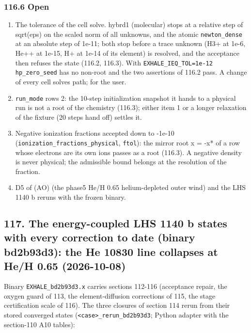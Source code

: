 \documentclass[english,a4paper]{my_memo}
\providecommand{\tightlist}{\setlength{\itemsep}{0pt}\setlength{\parskip}{0pt}}
\begin{document}
\subsubsection{116.6 Open}\label{1166-open}

\begin{enumerate}
\def\labelenumi{\arabic{enumi}.}
\tightlist
\item
  The tolerance of the cell solve. hybrd1 (molecular) stops at a relative
  step of sqrt(eps) on the scaled norm of all unknowns, and the atomic
  \texttt{newton\_dense} at an absolute step of 1e-11; both stop before a trace
  unknown (H3+ at 1e-6, He++ at 1e-15, H+ at 1e-14 of its element) is
  resolved, and the acceptance then refuses the state (116.2, 116.3). With
  \texttt{EXHALE\_IEQ\_TOL=1e-12} \texttt{hp\_zero\_seed} has no non-root and the two
  assertions of 116.2 pass. A change of every cell solve\textquotesingle s path; for the
  user.
\item
  \texttt{run\_mode} rows 2: the 10-step initialization snapshot it hands to a
  physical run is not a root of the chemistry (116.3); either item 1 or a
  longer relaxation of the fixture (20 steps hand off) settles it.
\item
  Negative ionization fractions accepted down to -1e-10
  (\texttt{ionization\_fractions\_physical}, \texttt{ftol}): the mirror root x = -x* of a
  row whose electrons are its own ions passes as a root (116.3). A negative
  density is never physical; the admissible bound belongs at the resolution
  of the fraction.
\item
  D5 of (AO) (the phase5 He/H 0.65 helium-depleted outer wind) and the LHS
  1140 b reruns with the frozen binary.
\end{enumerate}

\subsection{117. The energy-coupled LHS 1140 b states with every correction to date (binary bd2b93d3): the He 10830 line collapses at He/H 0.65 (2026-10-08)}\label{117-the-energy-coupled-lhs-1140-b-states-with-every-correction-to-date-binary-bd2b93d3-the-he-10830-line-collapses-at-heh-065-2026-10-08}

Binary \texttt{EXHALE\_bd2b93d3.x} carries sections 112-116 (acceptance repair, the
oxygen guard of 113, the element-diffusion corrections of 115, the stage
certification scale of 116). The three closures of section 114 rerun from
their stored converged states (\texttt{\textless{}case\textgreater{}\_rerun\_bd2b93d3}; Python adapter with
the section-110 A10 tables):
\end{document}
